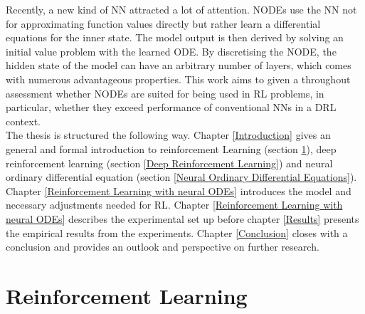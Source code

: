 \documentclass[10pt]{reportMaster}
\begin{document}
Recently, a new kind of \ac{NN} attracted a lot of attention. \ac{NODE}s use the \ac{NN} not for approximating function values directly but rather learn a differential equations for the inner state. The model output is then derived by solving an initial value problem with the learned \ac{ODE}. By discretising the \ac{NODE}, the hidden state of the model can have an arbitrary number of layers, which comes with numerous advantageous properties. This work aims to given a throughout assessment whether \ac{NODE}s are suited for being used in \ac{RL} problems, in particular, whether they exceed performance of conventional \ac{NN}s in a \ac{DRL} context. \\

The thesis is structured the following way. Chapter \ref{Introduction} gives an general and formal introduction to reinforcement Learning (section \ref{Reinforcement Learning}), deep reinforcement learning (section \ref{Deep Reinforcement Learning}) and neural ordinary differential equation (section \ref{Neural Ordinary Differential Equations}). Chapter \ref{Reinforcement Learning with neural ODEs} introduces the model and necessary adjustments needed for \ac{RL}. Chapter \ref{Reinforcement Learning with neural ODEs} describes the experimental set up before chapter \ref{Results} presents the empirical results from the experiments. Chapter \ref{Conclusion} closes with a conclusion and provides an outlook and perspective on further research. 

\newpage
\section{Reinforcement Learning} \label{Reinforcement Learning}
\end{document}

